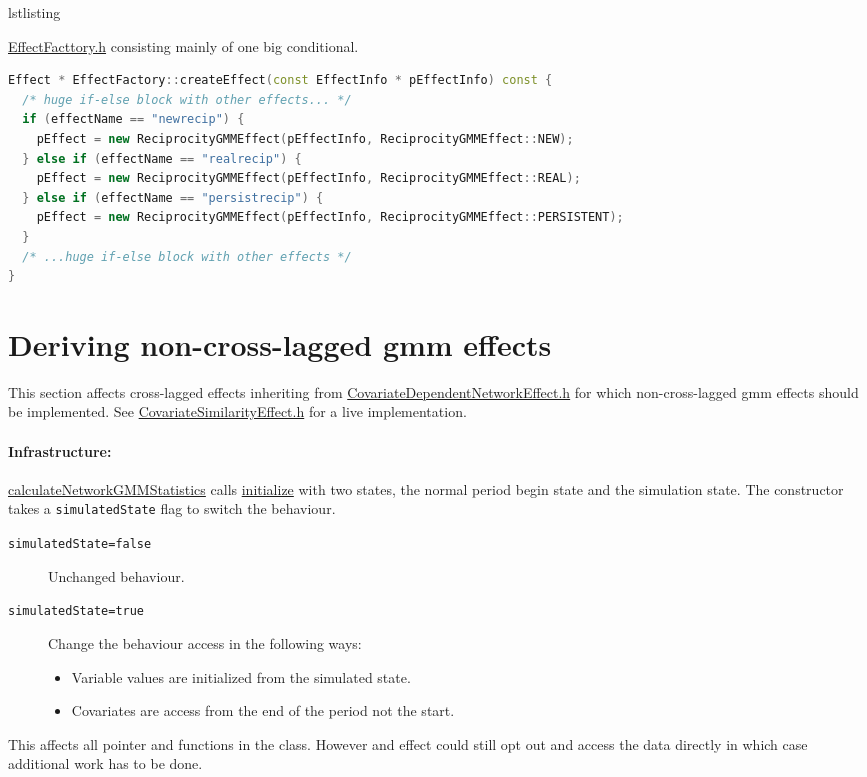 \documentclass{tufte-handout}
\makeatletter
\newenvironment{listing}[1][htbp]
  {\ifvmode\else\unskip\fi\begin{@tufte@float}[#1]{lstlisting}{}}
  {\end{@tufte@float}}
\def\linkstyle{} %
\newcommand\sourcelinkpF[2]{\href{../#1/#2}{\linkstyle{#2}}}
\newcommand\sourcelinkpfF[3]{\href{../#1/#2}{\linkstyle{#3}}}
\makeatother
\begin{document}
\begin{enumerate}
\begin{listing}
\label{lst:factory}
\caption{
  \sourcelinkpF{src/model/effects}{EffectFacttory.h} consisting mainly of one big conditional.
}
\begin{lstlisting}[language=c++]
Effect * EffectFactory::createEffect(const EffectInfo * pEffectInfo) const {
  /* huge if-else block with other effects... */
  if (effectName == "newrecip") {
    pEffect = new ReciprocityGMMEffect(pEffectInfo, ReciprocityGMMEffect::NEW);
  } else if (effectName == "realrecip") {
    pEffect = new ReciprocityGMMEffect(pEffectInfo, ReciprocityGMMEffect::REAL);
  } else if (effectName == "persistrecip") {
    pEffect = new ReciprocityGMMEffect(pEffectInfo, ReciprocityGMMEffect::PERSISTENT);
  }
  /* ...huge if-else block with other effects */
}
\end{lstlisting}
\end{listing}
\end{enumerate}

\section{Deriving non-cross-lagged gmm effects}

This section affects cross-lagged effects inheriting from \sourcelinkpF{src/model/effects}{CovariateDependentNetworkEffect.h} for which non-cross-lagged gmm effects should be implemented.
See \sourcelinkpF{src/model/effects}{CovariateSimilarityEffect.h} for a live implementation.

\paragraph{Infrastructure:}
\sourcelinkpfF{src/model}{StatisticCalculator.h}{calculateNetworkGMMStatistics} calls \sourcelinkpfF{src/model}{CovariateDependentNetworkEffect.h}{initialize} with two states, the normal period begin state and the simulation state.  The constructor takes a \texttt{simulatedState} flag to switch the behaviour.
\begin{description}
\item[\texttt{simulatedState=false}] Unchanged behaviour.
\item[\texttt{simulatedState=true}] Change the behaviour access in the following ways:
\begin{itemize}
\item Variable values are initialized from the simulated state.
\item Covariates are access from the end of the period not the start.
\end{itemize}
\end{description}
This affects all pointer and functions in the class.
However and effect could still opt out and access the data directly in which case additional work has to be done.
\end{document}
